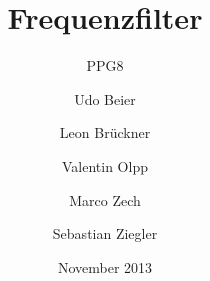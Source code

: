 


\title{Frequenzfilter}
\subtitle{PPG8}
\date{November 2013}
\author{Udo Beier \and Leon Brückner \and Valentin Olpp \and Marco Zech \and Sebastian Ziegler}
\maketitle
\tableofcontents
\listoffigures
\newpage










